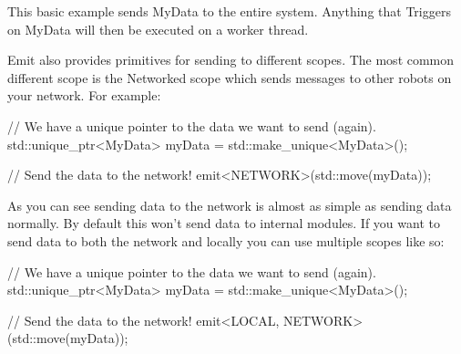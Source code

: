 \documentclass[english,12pt]{scrartcl}
\begin{document}
				This basic example sends MyData to the entire system.
				Anything that Triggers on MyData will then be executed on a worker thread.

				Emit also provides primitives for sending to different scopes.
				The most common different scope is the Networked scope which sends messages to other robots on your network.
				For example:

				\begin{cppcode}
					// We have a unique pointer to the data we want to send (again).
					std::unique_ptr<MyData> myData = std::make_unique<MyData>();

					// Send the data to the network!
					emit<NETWORK>(std::move(myData));
				\end{cppcode}

				As you can see sending data to the network is almost as simple as sending data normally.
				By default this won't send data to internal modules.
				If you want to send data to both the network and locally you can use multiple scopes like so:

				\begin{cppcode}
					// We have a unique pointer to the data we want to send (again).
					std::unique_ptr<MyData> myData = std::make_unique<MyData>();

					// Send the data to the network!
					emit<LOCAL, NETWORK>(std::move(myData));
				\end{cppcode}
\end{document}
